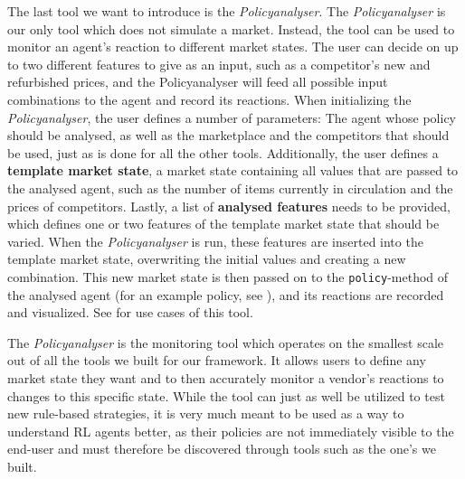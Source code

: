 The last tool we want to introduce is the \emph{Policyanalyser}. The \emph{Policyanalyser} is our only tool which does not simulate a market. Instead, the tool can be used to monitor an agent's reaction to different market states. The user can decide on up to two different features to give as an input, such as a competitor's new and refurbished prices, and the Policyanalyser will feed all possible input combinations to the agent and record its reactions. When initializing the \emph{Policyanalyser}, the user defines a number of parameters: The agent whose policy should be analysed, as well as the marketplace and the competitors that should be used, just as is done for all the other tools. Additionally, the user defines a \textbf{template market state}, a market state containing all values that are passed to the analysed agent, such as the number of items currently in circulation and the prices of competitors. Lastly, a list of \textbf{analysed features} needs to be provided, which defines one or two features of the template market state that should be varied. When the \emph{Policyanalyser} is run, these features are inserted into the template market state, overwriting the initial values and creating a new combination. This new market state is then passed on to the \texttt{policy}-method of the analysed agent (for an example policy, see ), and its reactions are recorded and visualized. See  for use cases of this tool.

The \emph{Policyanalyser} is the monitoring tool which operates on the smallest scale out of all the tools we built for our framework. It allows users to define any market state they want and to then accurately monitor a vendor's reactions to changes to this specific state. While the tool can just as well be utilized to test new rule-based strategies, it is very much meant to be used as a way to understand RL agents better, as their policies are not immediately visible to the end-user and must therefore be discovered through tools such as the one's we built.
